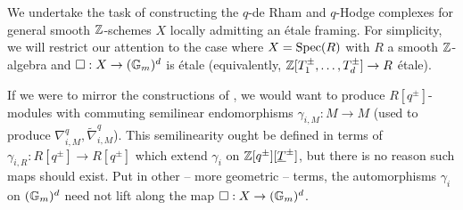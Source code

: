 We undertake the task of constructing the $q$-de Rham and $q$-Hodge complexes for general smooth $\mathbb{Z}$-schemes $X$ locally admitting an \'{e}tale framing. For simplicity, we will restrict our attention to the case where $X=\operatorname{Spec}(R)$ with $R$ a smooth $\mathbb{Z}$-algebra and $\square:X\to(\mathbb{G}_{m})^{d}$ is \'{e}tale (equivalently, $\mathbb{Z}[T_{1}^{\pm},\dots,T_{d}^{\pm}]\to R$ \'{e}tale). 

If we were to mirror the constructions of , we would want to produce $R[q^{\pm}]$-modules with commuting semilinear endomorphisms $\gamma_{i,M}:M\to M$ (used to produce $\nabla^{q}_{i,M},\widetilde{\nabla}_{i,M}^{q}$). This semilinearity ought be defined in terms of $\gamma_{i,R}:R[q^{\pm}]\to R[q^{\pm}]$ which extend $\gamma_{i}$ on $\mathbb{Z}[q^{\pm}][\underline{T}^{\pm}]$, but there is no reason such maps should exist. Put in other -- more geometric -- terms, the automorphisms $\gamma_{i}$ on $(\mathbb{G}_{m})^{d}$ need not lift along the map $\square:X\to(\mathbb{G}_{m})^{d}$.

